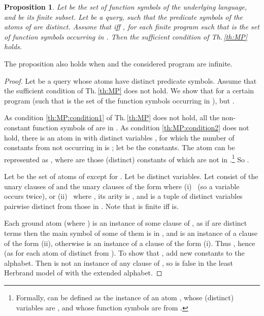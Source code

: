 \documentclass[a4paper]{tlp2}
\newtheorem{proposition}[theorem]{Proposition}
\begin{document}
\begin{proposition}
\label{prop:counterexample}
Let  be the set of function symbols of the underlying language, and
 be its finite subset.
Let  be a query, 
such that the predicate symbols of the atoms of  are distinct.
Assume that   iff , for each finite program 
such that 
 is the set of function symbols occurring in .  Then the 
sufficient condition of Th.\,\ref{th:MP} holds.
\end{proposition}
The proposition also holds when  and the considered program  are
infinite. 



\begin{proof}
Let  be a query whose atoms have distinct predicate symbols.
Assume that the sufficient condition of Th.\,\ref{th:MP} does not hold.
We show that for a certain program  
(such that  is the set of the function symbols occurring in ), 
\linebreak[3]
\mbox{} but .

As condition \ref{th:MP:condition1} of Th.\,\ref{th:MP} does not hold, 
all the non-constant function symbols of  are in .
As condition \ref{th:MP:condition2} does not hold, 
there is an atom  in  with  distinct variables ,
for which the number of constants from  not occurring in
 is \/; let    be the constants.
The atom can be represented as ,
where
 are those (distinct) constants of  which are not in .\footnote{Formally,  can be defined as the instance
  of an atom , whose
 (distinct) variables are , and 
 whose function symbols are from .
}
So .


Let  be the set of atoms of  except for .
Let  be  distinct variables.
Let  consist of the unary clauses of  and the
unary clauses of the form  where 
(i)~
(so a variable occurs twice),
or (ii)~
where , its arity is ,
and  is a
tuple of  distinct variables pairwise distinct from those in .
Note that  is finite iff  is.



Each ground atom  (where )
is an instance of some clause of ,
as if  are distinct terms then the main symbol of some of
them is in , and  is an instance of a clause of the form (ii),
otherwise  is an instance of a clause of the form (i).
Thus  , hence 
(as  for each atom  of  distinct from ).
To show that  , 
add new constants  to the alphabet.
Then  is not an instance of any clause of , 
so  is false in the least Herbrand model of 
with the extended alphabet.
\end{proof}
\end{document}
